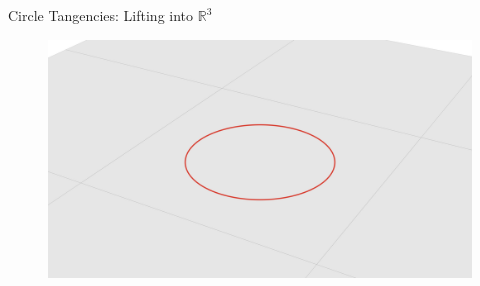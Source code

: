 \documentclass{beamer}
\newcommand{\RR}{\mathbb R}
\newcommand{\nfr}[1]{\begin{frame} #1
\end{frame}}
\begin{document}
\nfr{{Circle Tangencies: Lifting into $\RR^3$}

\begin{figure}[h]
    \centering
    \includegraphics[width=0.8
    \textwidth, trim={5cm 0 4cm 2cm}, clip=true]{images/Diagram3a.png}
\end{figure}
}
\end{document}
